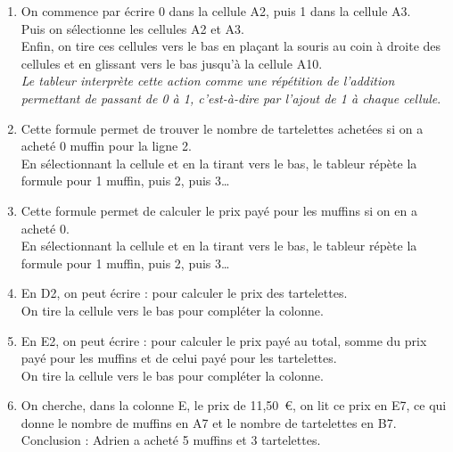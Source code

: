 \begin{colonne*exercice}
\begin{corrige}
\partie
   \begin{enumerate}
      \item On commence par écrire 0 dans la cellule A2, puis 1 dans la cellule A3. \\
      Puis on sélectionne les cellules A2 et A3. \\
      Enfin, on \og tire \fg{} ces cellules vers le bas en plaçant la souris au coin à droite des cellules et en glissant vers le bas jusqu'à la cellule A10. \\
      {\it Le tableur interprète cette action comme une répétition de l'addition permettant de passant de 0 à 1, c'est-à-dire par l'ajout de 1 à chaque cellule}.
      \item Cette formule permet de trouver le {\blue nombre de tartelettes achetées} si on a acheté 0 muffin pour la ligne 2. \\
         En sélectionnant la cellule et en la tirant vers le bas, le tableur répète la formule pour 1 muffin, puis 2, puis 3\dots
      \item Cette formule permet de calculer le {\blue prix payé pour les muffins} si on en a acheté 0. \\
         En sélectionnant la cellule et en la tirant vers le bas, le tableur répète la formule pour 1 muffin, puis 2, puis 3\dots
      \item En D2, on peut écrire : {\blue {}} pour calculer le prix des tartelettes. \\
         On tire la cellule vers le bas pour compléter la colonne.
      \item En E2, on peut écrire : {\blue {}} pour calculer le prix payé au total, somme du prix payé pour les muffins et de celui payé pour les tartelettes. \\
         On tire la cellule vers le bas pour compléter la colonne.
      \item On cherche, dans la colonne E, le prix de 11,50~\euro{}, on lit ce prix en E7, ce qui donne le nombre de muffins en A7 et le nombre de tartelettes en B7. \\
         Conclusion : {\blue Adrien a acheté 5 muffins et 3 tartelettes}.
   \end{enumerate}
   
   \Coupe
   

\end{corrige}
\end{colonne*exercice}
